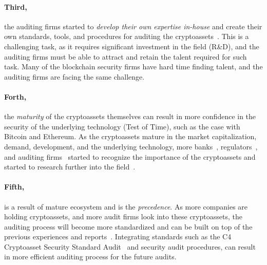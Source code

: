 \paragraph{Third,} the auditing firms started to \textit{develop their own expertise in-house} and create their own standards, tools, and procedures for auditing the cryptoassets~\cite{eyInternalTools,delloiteinternalauditor}. This is a challenging task, as it requires significant investment in the field (R\&D), and the auditing firms must be able to attract and retain the talent required for such task. Many of the blockchain security firms have hard time finding talent, and the auditing firms are facing the same challenge. 

\paragraph{Forth,} the \textit{maturity} of the cryptoassets themselves can result in more confidence in the security of the underlying technology (Test of Time), such as the case with Bitcoin and Ethereum. As the cryptoassets mature in the market capitalization, demand, development, and the underlying technology, more banks~\cite{azar2022financial,bankofenglandmaturity}, regulators~\cite{govofcanadamaturity,treasury2023future}, and auditing firms~\cite{kpmgadoption} started to recognize the importance of the cryptoassets and started to research further into the field~\cite{basel2021prudential,drozdz2023mature}. 


\paragraph{Fifth,} is a result of mature ecosystem and is the \textit{precedence}. As more companies are holding cryptoassets, and more audit firms look into these cryptoassets, the auditing process will become more standardized and can be built on top of the previous experiences and reports~\cite{cpabauditingcrypto,han2023accounting}. Integrating standards such as the C4 Cryptoasset Security Standard Audit~\cite{c4ccssa} and security audit procedures, can result in more efficient auditing process for the future audits.






